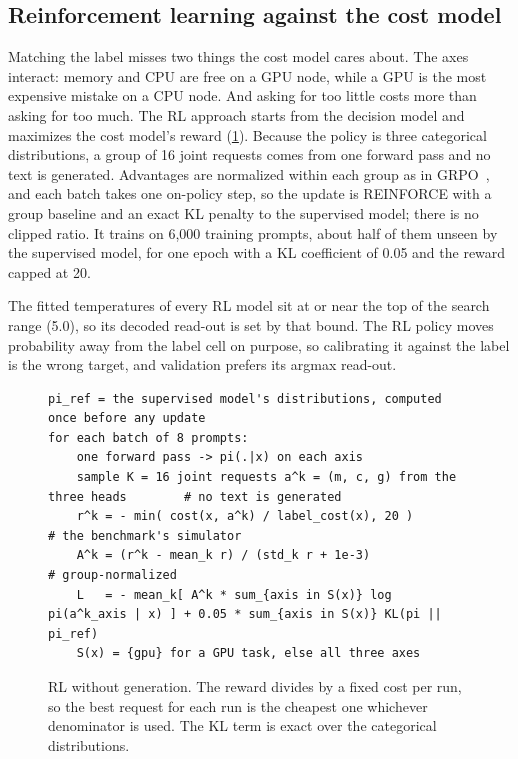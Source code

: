 \subsection{Reinforcement learning against the cost model}
Matching the label misses two things the cost model cares about. The axes interact: memory and CPU are free on
a GPU node, while a GPU is the most expensive mistake on a CPU node. And asking for too little costs more than
asking for too much. The RL approach starts from the decision model and maximizes the cost model's reward
(\cref{alg:grpo}). Because the policy is three categorical distributions, a group of 16 joint requests comes from
one forward pass and no text is generated. Advantages are normalized within each group as in
GRPO~\citep{shao2024deepseekmath}, and each batch takes one on-policy step, so the update is REINFORCE with a
group baseline and an exact KL penalty to the supervised model; there is no clipped ratio. It trains on 6,000
training prompts, about half of them unseen by the supervised model, for one epoch with a KL coefficient of 0.05
and the reward capped at 20.

The fitted temperatures of every RL model sit at or near the top of the search range (5.0), so its decoded
read-out is set by that bound. The RL policy moves probability away from the label cell on purpose, so
calibrating it against the label is the wrong target, and validation prefers its argmax read-out.

\begin{figure}[tbp]
\begin{lstlisting}
pi_ref = the supervised model's distributions, computed once before any update
for each batch of 8 prompts:
    one forward pass -> pi(.|x) on each axis
    sample K = 16 joint requests a^k = (m, c, g) from the three heads        # no text is generated
    r^k = - min( cost(x, a^k) / label_cost(x), 20 )                            # the benchmark's simulator
    A^k = (r^k - mean_k r) / (std_k r + 1e-3)                                  # group-normalized
    L   = - mean_k[ A^k * sum_{axis in S(x)} log pi(a^k_axis | x) ] + 0.05 * sum_{axis in S(x)} KL(pi || pi_ref)
    S(x) = {gpu} for a GPU task, else all three axes
\end{lstlisting}
\caption{RL without generation. The reward divides by a fixed cost per run, so the best request for each run is
the cheapest one whichever denominator is used. The KL term is exact over the categorical distributions.}
\label{alg:grpo}
\end{figure}

